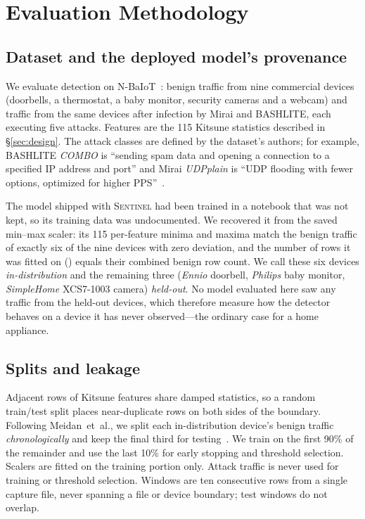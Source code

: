 \section{Evaluation Methodology}
\label{sec:method}

\subsection{Dataset and the deployed model's provenance}
We evaluate detection on N-BaIoT~\cite{meidan2018nbaiot}: benign traffic from
nine commercial devices (doorbells, a thermostat, a baby monitor, security
cameras and a webcam) and traffic from the same devices after infection by
Mirai and BASHLITE, each executing five attacks. Features are the 115 Kitsune
statistics described in \S\ref{sec:design}. The attack classes are defined by
the dataset's authors; for example, BASHLITE \emph{COMBO} is ``sending spam
data and opening a connection to a specified IP address and port'' and Mirai
\emph{UDPplain} is ``UDP flooding with fewer options, optimized for higher
PPS''~\cite{meidan2018nbaiot}.

The model shipped with \textsc{Sentinel} had been trained in a notebook that
was not kept, so its training data was undocumented. We recovered it from the
saved min--max scaler: its 115 per-feature minima and maxima match the benign
traffic of exactly six of the nine devices with zero deviation, and the number
of rows it was fitted on (\NprovRows{}) equals their combined benign row count.
We call these six devices \emph{in-distribution} and the remaining three
(\emph{Ennio} doorbell, \emph{Philips} baby monitor, \emph{SimpleHome} XCS7-1003
camera) \emph{held-out}. No model evaluated here saw any traffic from the
held-out devices, which therefore measure how the detector behaves on a device
it has never observed---the ordinary case for a home appliance.

\subsection{Splits and leakage}
Adjacent rows of Kitsune features share damped statistics, so a random
train/test split places near-duplicate rows on both sides of the boundary.
Following Meidan~et~al., we split each in-distribution device's benign
traffic \emph{chronologically} and keep the final third for
testing~\cite{meidan2018nbaiot}. We train on the first 90\% of the remainder
and use the last 10\% for early stopping and threshold selection. Scalers are
fitted on the training portion only. Attack traffic is never used for training
or threshold selection. Windows are ten consecutive rows from a single capture
file, never spanning a file or device boundary; test windows do not overlap.

